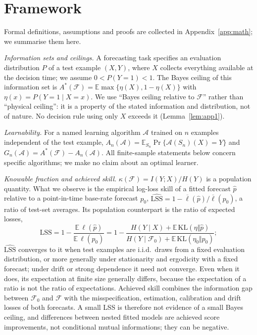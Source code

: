 \documentclass[journal]{IEEEtran}
\theoremstyle{definition}
\newcommand{\E}{\mathbb{E}}
\newcommand{\F}{\mathcal{F}}
\newcommand{\LSS}{\mathrm{LSS}}
\newcommand{\KL}{\mathrm{KL}}
\begin{document}
\section{Framework}\label{sec:framework}
Formal definitions, assumptions and proofs are collected in Appendix~\ref{app:math}; we summarise them here.

\emph{Information sets and ceilings.} A forecasting task specifies an evaluation distribution $P$ of a test example $(X,Y)$, where $X$ collects everything available at the decision time; we assume $0<P(Y=1)<1$. The Bayes ceiling of this information set is $A^*(\F)=\E\max\{\eta(X),1-\eta(X)\}$ with $\eta(x)=P(Y=1\mid X=x)$. We use ``Bayes ceiling relative to $\F$'' rather than ``physical ceiling'': it is a property of the stated information and distribution, not of nature. No decision rule using only $X$ exceeds it (Lemma~\ref{lem:app1}).

\emph{Learnability.} For a named learning algorithm $\mathcal A$ trained on $n$ examples independent of the test example, $A_n(\mathcal A)=\E_{S_n}\Pr\{\mathcal A(S_n)(X)=Y\}$ and $G_n(\mathcal A)=A^*(\F)-A_n(\mathcal A)$. All finite-sample statements below concern specific algorithms; we make no claim about an optimal learner.

\emph{Knowable fraction and achieved skill.} $\kappa(\F)=I(Y;X)/H(Y)$ is a population quantity. What we observe is the empirical log-loss skill of a fitted forecast $\hat p$ relative to a point-in-time base-rate forecast $p_0$, $\widehat{\LSS}=1-\overline{\ell}(\hat p)/\overline{\ell}(p_0)$, a ratio of test-set averages. Its population counterpart is the ratio of expected losses,
\begin{equation}\label{eq:lss}
\LSS=1-\frac{\E\,\ell(\hat p)}{\E\,\ell(p_0)}=1-\frac{H(Y\mid X)+\E\,\KL(\eta\Vert\hat p)}{H(Y\mid\F_0)+\E\,\KL(\eta_0\Vert p_0)};
\end{equation}
$\widehat{\LSS}$ converges to it when test examples are i.i.d.\ draws from a fixed evaluation distribution, or more generally under stationarity and ergodicity with a fixed forecast; under drift or strong dependence it need not converge. Even when it does, its expectation at finite size generally differs, because the expectation of a ratio is not the ratio of expectations. Achieved skill combines the information gap between $\F_0$ and $\F$ with the misspecification, estimation, calibration and drift losses of both forecasts. A small LSS is therefore not evidence of a small Bayes ceiling, and differences between nested fitted models are achieved score improvements, not conditional mutual informations; they can be negative.
\end{document}

